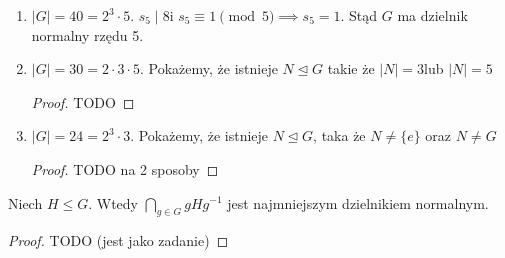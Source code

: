 \begin{enumerate}[label=\alph*)]
	\item $\left| G \right| = 40 = 2^3\cdot 5$. $s_5\mid 8$i $ s_5 \equiv 1 \pmod{5} \implies s_5=1$. Stąd $G$ ma dzielnik normalny rzędu 5.
	\item $\left| G \right| = 30 = 2\cdot 3\cdot 5$. Pokażemy, że istnieje $N\unlhd G$ takie że $\left| N \right| = 3 $lub $\left| N \right| = 5$ 
		\begin{proof}
			TODO
		\end{proof} 
	\item $\left| G \right| = 24 = 2^3\cdot 3$. Pokażemy, że istnieje $N\unlhd G$, taka że $N\neq \{e\} $ oraz $N\neq G$
		\begin{proof}
			TODO na 2 sposoby
		\end{proof} 
\end{enumerate}
\begin{remark}
	Niech $H\le G$. Wtedy $\bigcap_{g\in G} gHg^{-1}$ jest najmniejszym dzielnikiem normalnym.
\end{remark} 
\begin{proof}
	TODO (jest jako zadanie)
\end{proof} 
